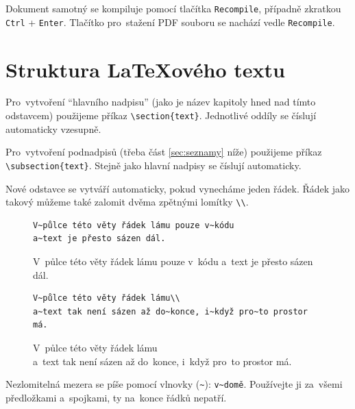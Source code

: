 Dokument samotný se kompiluje pomocí tlačítka \texttt{Recompile}, případně zkratkou \texttt{Ctrl} + \texttt{Enter}.
Tlačítko pro~stažení PDF souboru se nachází vedle \texttt{Recompile}.


\clearpage
\section[Struktura LaTeXového ]{Struktura \LaTeX{}ového textu}

Pro~vytvoření \enquote{hlavního nadpisu} (jako je název kapitoly hned nad tímto odstavcem) použijeme příkaz \verb|\section{text}|.
Jednotlivé oddíly se číslují automaticky vzesupně.

Pro~vytvoření podnadpisů (třeba část \ref{sec:seznamy} níže) použijeme příkaz  \verb|\subsection{text}|.
Stejně jako hlavní nadpisy se číslují automaticky.

Nové odstavce se vytváří automaticky, pokud vynecháme jeden řádek.
Řádek jako takový můžeme také zalomit dvěma zpětnými lomítky \verb|\\|.

\begin{figure}[ht]
\onehalfspacing
\begin{mdframed}
\begin{verbatim}
V~půlce této věty řádek lámu pouze v~kódu
a~text je přesto sázen dál.
\end{verbatim}

V~půlce této věty řádek lámu pouze v~kódu
a~text je přesto sázen dál.

\begin{verbatim}
V~půlce této věty řádek lámu\\
a~text tak není sázen až do~konce, i~když pro~to prostor má.
\end{verbatim}

V~půlce této věty řádek lámu\\
a~text tak není sázen až do~konce, i~když pro~to prostor má.
\end{mdframed}
\end{figure}

Nezlomitelná mezera se píše pomocí vlnovky (\texttt{\~}): \verb|v~domě|.
Používejte ji za~všemi předložkami a~spojkami, ty na~konce řádků nepatří.

